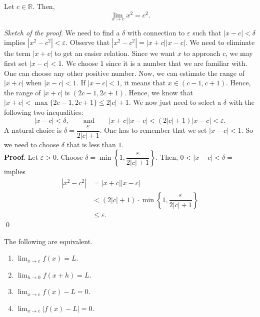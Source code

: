 \documentclass[11pt]{book}
\theoremstyle{break}
\theoremstyle{no_label}
\newcommand{\bbR}{\mathbb{R}}
\numberwithin{equation}{section}
\begin{document}
\begin{proposition}
    Let $c\in\bbR$. Then, $$\lim_{x\to c}x^2=c^2.$$
\end{proposition}
\textit{Sketch of the proof}. We need to find a $\delta$ with connection to $\varepsilon$ such that $|x-c|<\delta$ implies $|x^2-c^2|<\varepsilon$. Observe that $|x^2-c^2|=|x+c||x-c|$. We need to eliminate the term $|x+c|$ to get an easier relation. Since we want $x$ to approach $c$, we may first set $|x-c|<1$. We choose $1$ since it is a number that we are familiar with. One can choose any other positive number. Now, we can estimate the range of $|x+c|$ when $|x-c|<1$. If $|x-c|<1$, it means that $x\in(c-1, c+1)$. Hence, the range of $|x+c|$ is $(2c-1, 2c+1)$. Hence, we know that $|x+c|<\max\{2c-1, 2c+1\}\leq 2|c|+1$. We now just need to select a $\delta$ with the following two inequalities: 
\begin{equation*}
    |x-c|<\delta, \qquad\text{and}\qquad |x+c||x-c|<(2|c|+1)|x-c|<\varepsilon.
\end{equation*}
A natural choice is $\delta=\dfrac{\varepsilon}{2|c|+1}$. One has to remember that we set $|x-c|<1$. So we need to choose $\delta$ that is less than $1$.\\\setlength{\delimitershortfall}{0pt}
\textbf{Proof}. Let $\varepsilon>0$. Choose $\delta=\min\left\{1, \dfrac{\varepsilon}{2|c|+1}\right\}$. Then, $0<|x-c|<\delta=$ implies \begin{align*}
    |x^2-c^2|&=|x+c||x-c|\\
    &<(2|c|+1)\cdot\min\left\{1, \dfrac{\varepsilon}{2|c|+1}\right\}\\
    &\leq\varepsilon.
\end{align*} \qed

\setlength{\delimitershortfall}{13.5pt}

\begin{theorem}
    The following are equivalent.
    \vspace{-1.2em}
    \begin{multicols}{2}
        \begin{enumerate}
            \item $\displaystyle\lim_{x\to c}f(x)=L$.
            \item $\displaystyle\lim_{h\to 0}f(x+h)=L$.
            \item $\displaystyle\lim_{x\to c}f(x)-L=0$.
            \item $\displaystyle\lim_{x\to c}|f(x)-L|=0$.
        \end{enumerate}
    \end{multicols}
    \vspace{0.01em}
\end{theorem}
\end{document}
